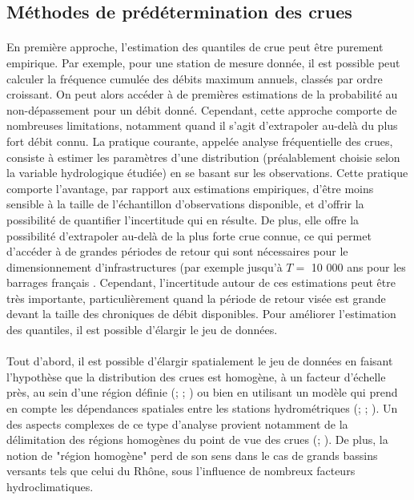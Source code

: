 	\subsection*{Méthodes de prédétermination des crues}
	\label{subsec:méthodes}	
	
	\paragraph{} En première approche, l'estimation des quantiles de crue peut être purement empirique. Par exemple, pour une station de mesure donnée, il est possible peut calculer la fréquence cumulée des débits maximum annuels, classés par ordre croissant. On peut alors accéder à de premières estimations de la probabilité au non-dépassement pour un débit donné. Cependant, cette approche comporte de nombreuses limitations, notamment quand il s'agit d'extrapoler au-delà du plus fort débit connu. La pratique courante, appelée analyse fréquentielle des crues, consiste à estimer les paramètres d'une distribution (préalablement choisie selon la variable hydrologique étudiée) en se basant sur les observations. Cette pratique comporte l'avantage, par rapport aux estimations empiriques, d'être moins sensible à la taille de l'échantillon d'observations disponible, et d'offrir la possibilité de quantifier l'incertitude qui en résulte. De plus, elle offre la possibilité d'extrapoler au-delà de la plus forte crue connue, ce qui permet d'accéder à de grandes périodes de retour qui sont nécessaires pour le dimensionnement d'infrastructures (par exemple jusqu'à $T =$ 10 000 ans pour les barrages français \citep{le_delliou_recommandations_2014}. Cependant, l'incertitude autour de ces estimations peut être très importante, particulièrement quand la période de retour visée est grande devant la taille des chroniques de débit disponibles. Pour améliorer l'estimation des quantiles, il est possible d'élargir le jeu de données. 
	
	\paragraph{} Tout d'abord, il est possible d'élargir spatialement le jeu de données en faisant l'hypothèse que la distribution des crues est homogène, à un facteur d'échelle près, au sein d'une région définie (\cite{hosking_regional_1997}; \cite{gaume_bayesian_2010}; \cite{viglione_flood_2013}) ou bien en utilisant un modèle qui prend en compte les dépendances spatiales entre les stations hydrométriques (\cite{kjeldsen_exploratory_2009}; \cite{renard_bayesian_2011}; \cite{sun_general_2014}). Un des aspects complexes de ce type d'analyse provient notamment de la délimitation des régions homogènes du point de vue des crues (\cite{ouarda_regional_2001}; \cite{han_network_2020}). De plus, la notion de "région homogène" perd de son sens dans le cas de grands bassins versants tels que celui du Rhône, sous l'influence de nombreux facteurs hydroclimatiques.  
	
